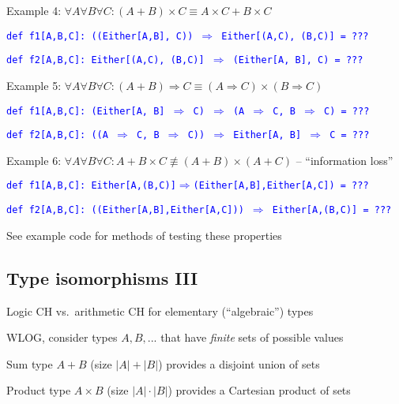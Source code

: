 Example 4: $\forall A\forall B\forall C:(A+B)\times C\equiv A\times C+B\times C$

\texttt{\textcolor{blue}{\footnotesize{}def f1{[}A,B,C{]}: ((Either{[}A,B{]},
C)) $\Rightarrow$ Either{[}(A,C), (B,C){]} = ???}}{\footnotesize\par}

\texttt{\textcolor{blue}{\footnotesize{}def f2{[}A,B,C{]}: Either{[}(A,C),
(B,C){]} $\Rightarrow$ (Either{[}A, B{]}, C) = ???}}{\footnotesize\par}

Example 5: $\forall A\forall B\forall C:(A+B)\Rightarrow C\equiv(A\Rightarrow C)\times(B\Rightarrow C)$

\texttt{\textcolor{blue}{\footnotesize{}def f1{[}A,B,C{]}: (Either{[}A,
B{]} $\Rightarrow$ C) $\Rightarrow$ (A $\Rightarrow$ C, B $\Rightarrow$
C) = ???}}{\footnotesize\par}

\texttt{\textcolor{blue}{\footnotesize{}def f2{[}A,B,C{]}: ((A $\Rightarrow$
C, B $\Rightarrow$ C)) $\Rightarrow$ Either{[}A, B{]} $\Rightarrow$
C = ???}}{\footnotesize\par}

Example 6: $\forall A\forall B\forall C:A+B\times C\not\equiv(A+B)\times(A+C)$
– ``information loss''

\texttt{\textcolor{blue}{\footnotesize{}def f1{[}A,B,C{]}: Either{[}A,(B,C){]}$\Rightarrow$(Either{[}A,B{]},Either{[}A,C{]})
= ???}}{\footnotesize\par}

\texttt{\textcolor{blue}{\footnotesize{}def f2{[}A,B,C{]}: ((Either{[}A,B{]},Either{[}A,C{]}))
$\Rightarrow$ Either{[}A,(B,C){]} = ???}}{\footnotesize\par}

See example code for methods of testing these properties

\subsection{Type isomorphisms III}

Logic CH vs.\ arithmetic CH for elementary (``algebraic'') types

WLOG, consider types $A,B,...$ that have \emph{finite} sets of possible
values

Sum type $A+B$ (size $\left|A\right|+\left|B\right|$) provides a
disjoint union of sets

Product type $A\times B$ (size $\left|A\right|\cdot\left|B\right|$)
provides a Cartesian product of sets

